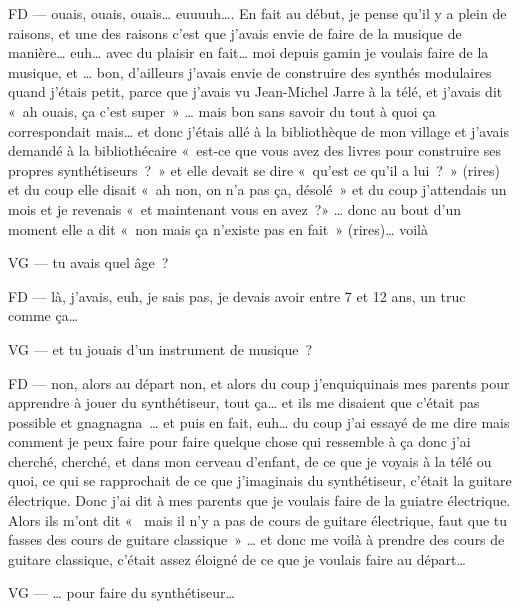 FD —  ouais, ouais, ouais… euuuuh…. En fait au début, je pense qu'il y a plein de raisons, et une des raisons c'est que j'avais envie de faire de la musique de manière… euh… avec du plaisir en fait… moi depuis gamin je voulais faire de la musique, et … bon, d'ailleurs j'avais envie de construire des synthés modulaires quand j'étais petit, parce que j'avais vu Jean-Michel Jarre à la télé, et j'avais dit « ah ouais, ça c'est super » … mais bon sans savoir du tout à quoi ça correspondait mais… et donc j'étais allé à la bibliothèque de mon village et j'avais demandé à la bibliothécaire « est-ce que vous avez des livres pour construire ses propres synthétiseurs ? » et elle devait se dire « qu'est ce qu'il a lui ? » (rires) et du coup elle disait « ah non, on n'a pas ça, désolé » et du coup j'attendais un mois et je revenais « et maintenant vous en avez ?» … donc au bout d'un moment elle a dit « non mais ça n'existe pas en fait » (rires)… voilà 

VG —  tu avais quel âge ? 

FD —  là, j'avais, euh, je sais pas, je devais avoir entre 7 et 12 ans, un truc comme ça… 

VG —  et tu jouais d'un instrument de musique ? 

FD —  non, alors au départ non, et alors du coup j'enquiquinais mes parents pour apprendre à jouer du synthétiseur, tout ça… et ils me disaient que c'était pas possible et gnagnagna … et puis en fait, euh… du coup j'ai essayé de me dire mais comment je peux faire pour faire quelque chose qui ressemble à ça donc j'ai cherché, cherché, et dans mon cerveau d'enfant, de ce que je voyais à la télé ou quoi, ce qui se rapprochait de ce que j'imaginais du synthétiseur, c'était la guitare électrique. Donc j'ai dit à mes parents que je voulais faire de la guiatre électrique. Alors ils m'ont dit «  mais il n'y a pas de cours de guitare électrique, faut que tu fasses des cours de guitare classique » … et donc me voilà à prendre des cours de guitare classique, c'était assez éloigné de ce que je voulais faire au départ… 

VG —  … pour faire du synthétiseur… 

